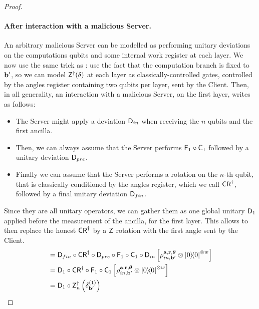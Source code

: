 \begin{proof}
    \paragraph{After interaction with a malicious Server.}
    An arbitrary malicious Server can be modelled as performing unitary deviations on the computations qubits and some internal work register at each layer.
    We now use the same trick as \cite{FK17unconditionally,KKLM22unifying}: use the fact that the computation branch is fixed to $\mathbf b'$, so we can model $\mathsf{Z}^\dagger(\delta)$ at each layer as classically-controlled gates, controlled by the angles register containing two qubits per layer, sent by the Client. Then, in all generality, an interaction with a malicious Server, on the first layer, writes as follows:
    \begin{itemize}
        \item The Server might apply a deviation $\mathsf{D}_{in}$ when receiving the $n$ qubits and the first ancilla.
        \item Then, we can always assume that the Server performs
        $\mathsf{F}_1\circ \mathsf{C}_1$ followed by a unitary deviation $\mathsf{D}_{pre}$.
        \item Finally we can assume that the Server performs a rotation on the $n$-th qubit, that is classically conditioned by the angles register, which we call $\mathsf{CR}^\dagger$, followed by a final unitary deviation $\mathsf{D}_{fin}$.
    \end{itemize}
        Since they are all unitary operators, we can gather them as one global unitary $\mathsf{D}_1$ applied before the measurement of the ancilla, for the first layer. This allows to then replace the honest $\mathsf{CR}^\dagger$ by a $\mathsf{Z}$ rotation with the first angle sent by the Client.
    \begin{align}
        &=
        \D_{fin}
        \circ
        \CR^\dagger
        \circ
        \D_{pre}
        \circ
        \F_1
        \circ
        \C_1
        \circ
        \D_{in}
        \left[
            \rho_{in, \b'}^{\a, \r, \boldsymbol{\theta}}
            \otimes
            \ketbra0^{\otimes w}
         \right]
         \\
         &=
         \D_1
         \circ
        \CR^\dagger
        \circ
        \F_1
        \circ
        \C_1
        \left[
            \rho_{in, \b'}^{\a, \r, \boldsymbol{\theta}}
            \otimes
            \ketbra0^{\otimes w}
         \right]
         \label{eq:unitarization:avant}
         \\
         &=
         \D_1
         \circ
        \Z^\dagger_n\left( \delta_{\b'}^{(1)} \right)

\end{align}
\end{proof}
